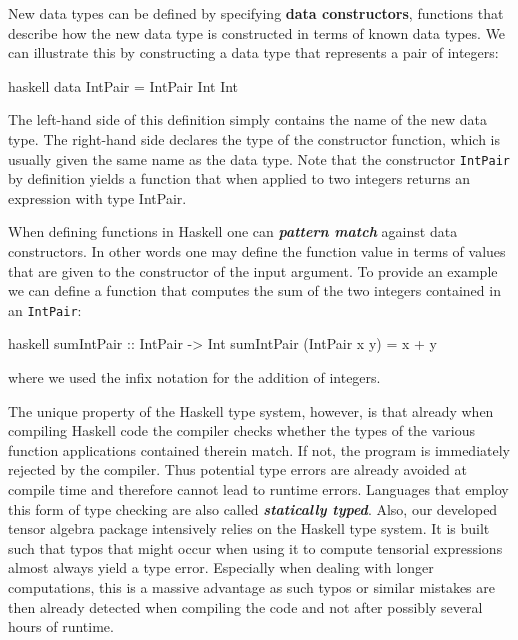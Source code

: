 New data types can be defined by specifying \textbf{\textbf{data constructors}}, functions that describe how the new data type is constructed in terms of known data types. We can illustrate this by constructing a data type that represents a pair of integers:
\begin{center}
\begin{cminted}{haskell}
data IntPair = IntPair Int Int 
\end{cminted}
\end{center}
The left-hand side of this definition simply contains the name of the new data type. The right-hand side declares the type of the constructor function, which is usually given the same name as the data type. 
Note that the constructor \texttt{IntPair} by definition yields a function that when applied to two integers returns an expression with type IntPair. 

When defining functions in Haskell one can \textbf{\textit{pattern match}} against data constructors. In other words one may define the function value in terms of values that are given to the constructor of the input argument. To provide an example we can define a function that computes the sum of the two integers contained in an \texttt{IntPair}:
\begin{center}
\begin{cminted}{haskell}
sumIntPair :: IntPair -> Int 
sumIntPair (IntPair x y) = x + y
\end{cminted}
\end{center}
where we used the infix notation for the addition of integers. 

The unique property of the Haskell type system, however, is that already when compiling Haskell code the compiler checks whether the types of the various function applications contained therein match. If not, the program is immediately rejected by the compiler. Thus potential type errors are already avoided at compile time and therefore cannot lead to runtime errors. Languages that employ this form of type checking are also called \textit{\textbf{statically typed}}. Also, our developed tensor algebra package intensively relies on the Haskell type system. It is built such that typos that might occur when using it to compute tensorial expressions almost always yield a type error. Especially when dealing with longer computations, this is a massive advantage as such typos or similar mistakes are then already detected when compiling the code and not after possibly several hours of runtime.  

